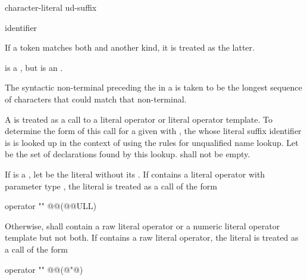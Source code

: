 \begin{bnf}
\br
    character-literal ud-suffix
\end{bnf}

\begin{bnf}
\br
    identifier
\end{bnf}

\pnum
If a token matches both  and another  kind, it
is treated as the latter. \begin{example} 
is a , but  is an
. \end{example}
The syntactic non-terminal preceding the  in a
 is taken to be the longest sequence of
characters that could match that non-terminal.

\pnum
A  is treated as a call to a literal operator or
literal operator template. To determine the form of this call for a
given   with  ,
the  whose literal suffix identifier is  is
looked up in the context of  using the rules for unqualified name
lookup. Let  be the set of declarations found by
this lookup.  shall not be empty.

\pnum
If  is a , let  be the literal
without its . If  contains a literal operator with
parameter type , the literal  is treated as a call of
the form

\begin{codeblock}
operator "" @@(@@ULL)
\end{codeblock}

Otherwise,  shall contain a raw literal operator
or a numeric literal operator template but not both.
If  contains a raw literal operator,
the literal  is treated as a call of the form

\begin{codeblock}
operator "" @@(@"@)
\end{codeblock}


